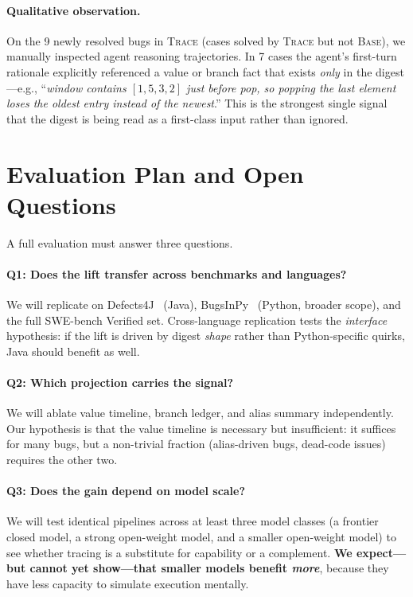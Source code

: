 \documentclass[sigconf,review,anonymous,nonacm]{acmart}
\begin{document}
\paragraph{Qualitative observation.} On the 9 newly resolved bugs in
\textsc{Trace} (cases solved by \textsc{Trace} but not \textsc{Base}), we
manually inspected agent reasoning trajectories. In 7 cases the agent's
first-turn rationale explicitly referenced a value or branch fact that
exists \emph{only} in the digest---e.g., ``\textit{window contains
$[1,5,3,2]$ just before pop, so popping the last element loses the oldest
entry instead of the newest}.'' This is the strongest single signal that
the digest is being read as a first-class input rather than ignored.

\section{Evaluation Plan and Open Questions}
\label{sec:plan}

A full evaluation must answer three questions.

\paragraph{Q1: Does the lift transfer across benchmarks and languages?}
We will replicate on Defects4J~\cite{just2014defects4j} (Java),
BugsInPy~\cite{widyasari2020bugsinpy} (Python, broader scope), and the full
SWE-bench Verified set. Cross-language replication tests the
\emph{interface} hypothesis: if the lift is driven by digest \emph{shape}
rather than Python-specific quirks, Java should benefit as well.

\paragraph{Q2: Which projection carries the signal?} We will ablate value
timeline, branch ledger, and alias summary independently. Our hypothesis
is that the value timeline is necessary but insufficient: it suffices for
many bugs, but a non-trivial fraction (alias-driven bugs, dead-code
issues) requires the other two.

\paragraph{Q3: Does the gain depend on model scale?} We will test
identical pipelines across at least three model classes (a frontier
closed model, a strong open-weight model, and a smaller open-weight
model) to see whether tracing is a substitute for capability or a
complement. \textbf{We expect---but cannot yet show---that smaller models
benefit \emph{more}}, because they have less capacity to simulate
execution mentally.
\end{document}
